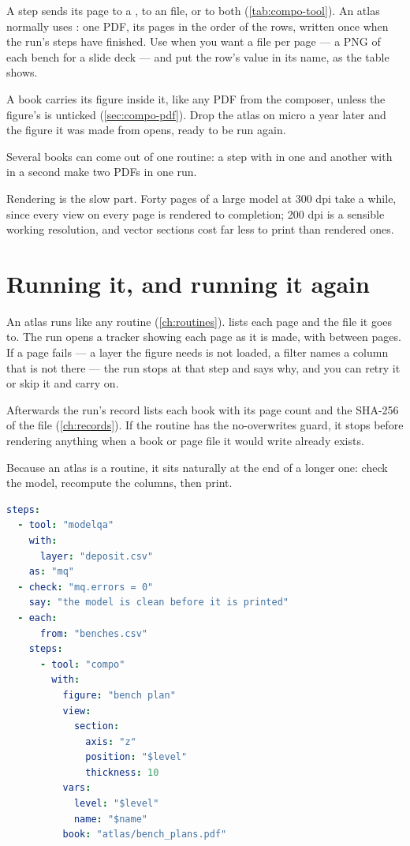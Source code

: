 A  step sends its page to a , to an  file, or to both (\cref{tab:compo-tool}). An atlas normally uses : one PDF, its pages in the order of the rows, written once when the run's steps have finished. Use  when you want a file per page — a PNG of each bench for a slide deck — and put the row's value in its name, as the table shows.

A book carries its figure inside it, like any PDF from the composer, unless the figure's  is unticked (\cref{sec:compo-pdf}). Drop the atlas on micro a year later and the figure it was made from opens, ready to be run again.

Several books can come out of one routine: a step with  in one  and another with  in a second make two PDFs in one run.

Rendering is the slow part. Forty pages of a large model at 300 dpi take a while, since every view on every page is rendered to completion; 200 dpi is a sensible working resolution, and vector sections cost far less to print than rendered ones.

\section{Running it, and running it again}\label{sec:atlas-run}

An atlas runs like any routine (\cref{ch:routines}).  lists each page and the file it goes to. The run opens a tracker showing each page as it is made, with  between pages. If a page fails — a layer the figure needs is not loaded, a filter names a column that is not there — the run stops at that step and says why, and you can retry it or skip it and carry on.

Afterwards the run's record lists each book with its page count and the SHA-256 of the file (\cref{ch:records}). If the routine has the no-overwrites guard, it stops before rendering anything when a book or page file it would write already exists.

Because an atlas is a routine, it sits naturally at the end of a longer one: check the model, recompute the columns, then print.

\begin{lstlisting}[language=yaml]
steps:
  - tool: "modelqa"
    with:
      layer: "deposit.csv"
    as: "mq"
  - check: "mq.errors = 0"
    say: "the model is clean before it is printed"
  - each:
      from: "benches.csv"
    steps:
      - tool: "compo"
        with:
          figure: "bench plan"
          view:
            section:
              axis: "z"
              position: "$level"
              thickness: 10
          vars:
            level: "$level"
            name: "$name"
          book: "atlas/bench_plans.pdf"
\end{lstlisting}

